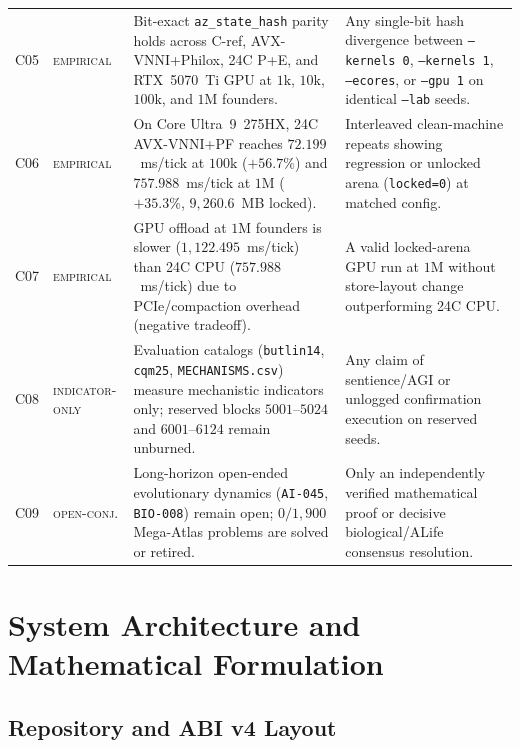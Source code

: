 \documentclass[11pt,reqno]{amsart}
\newcommand{\tagbadge}[1]{\textsc{\scriptsize #1}}
\newcommand{\code}[1]{\texttt{\footnotesize #1}}
\newcommand{\us}{\_\allowbreak}
\begin{document}
\begin{table}[htbp]
\begin{tabularx}{\textwidth}{L{0.65cm}L{2.25cm}YY}
C05 & \tagbadge{empirical} & Bit-exact \code{az\us state\us hash} parity holds across C-ref, AVX-VNNI+Philox, 24C P+E, and RTX~5070~Ti GPU at $1\text{k}$, $10\text{k}$, $100\text{k}$, and $1\text{M}$ founders. & Any single-bit hash divergence between \code{--kernels 0}, \code{--kernels 1}, \code{--ecores}, or \code{--gpu 1} on identical \code{--lab} seeds. \\
C06 & \tagbadge{empirical} & On Core Ultra~9~275HX, 24C AVX-VNNI+PF reaches $72.199$~ms/tick at $100\text{k}$ ($+56.7\%$) and $757.988$~ms/tick at $1\text{M}$ ($+35.3\%$, $9{,}260.6$~MB locked). & Interleaved clean-machine repeats showing regression or unlocked arena (\code{locked=0}) at matched config. \\
C07 & \tagbadge{empirical} & GPU offload at $1\text{M}$ founders is slower ($1{,}122.495$~ms/tick) than 24C CPU ($757.988$~ms/tick) due to PCIe/compaction overhead (negative tradeoff). & A valid locked-arena GPU run at $1\text{M}$ without store-layout change outperforming 24C CPU. \\
C08 & \tagbadge{indicator-only} & Evaluation catalogs (\code{butlin14}, \code{cqm25}, \code{MECHANISMS.csv}) measure mechanistic indicators only; reserved blocks $5001$--$5024$ and $6001$--$6124$ remain unburned. & Any claim of sentience/AGI or unlogged confirmation execution on reserved seeds. \\
C09 & \tagbadge{open-conj.} & Long-horizon open-ended evolutionary dynamics (\code{AI-045}, \code{BIO-008}) remain open; $0/1{,}900$ Mega-Atlas problems are solved or retired. & Only an independently verified mathematical proof or decisive biological/ALife consensus resolution. \\
\bottomrule
\end{tabularx}
\end{table}

\section{System Architecture and Mathematical Formulation}

\subsection{Repository and ABI v4 Layout}
\end{document}
